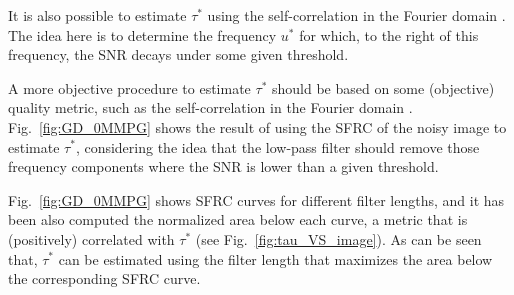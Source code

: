 \documentclass{article}
\begin{document}




It is also possible to estimate $\tau^*$ using the self-correlation in
the Fourier domain \cite{koho2019fourier}. The idea here is to
determine the frequency $u^*$ for which, to the right of this
frequency, the SNR decays under some given threshold. 

A more objective procedure to estimate $\tau^*$ should be based on
some (objective) quality metric, such as the self-correlation in the
Fourier domain \cite{koho2019fourier}. Fig.~\ref{fig:GD_0MMPG} shows
the result of using the SFRC of the noisy image to estimate $\tau^*$,
considering the idea that the low-pass filter should remove those
frequency components where the SNR is lower than a given threshold.



Fig.~\ref{fig:GD_0MMPG} shows
SFRC curves for different filter lengths, and it has been also
computed the normalized area below each curve, a metric that is
(positively) correlated with $\tau^*$ (see
Fig.~\ref{fig:tau_VS_image}). As can be seen that, $\tau^*$ can be
estimated using the filter length that maximizes the area below the
corresponding SFRC curve.
\end{document}

